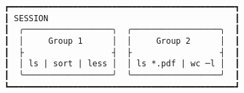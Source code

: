 \documentclass[varwidth=55em]{standalone}
\begin{document}
\begin{verbatim}
┏━━━━━━━━━━━━━━━━━━━━━━━━━━━━━━━━━━━━━━━━━━━━━━┓
┃ SESSION                                      ┃
┃  ╭──────────────────╮  ╭──────────────────╮  ┃
┃  │     Group 1      │  │     Group 2      │  ┃
┃  ├                  ┤  ├                  ┤  ┃
┃  │ ls | sort | less │  │ ls *.pdf | wc ─l │  ┃
┃  ╰──────────────────╯  ╰──────────────────╯  ┃
┗━━━━━━━━━━━━━━━━━━━━━━━━━━━━━━━━━━━━━━━━━━━━━━┛
\end{verbatim}
\end{document}
